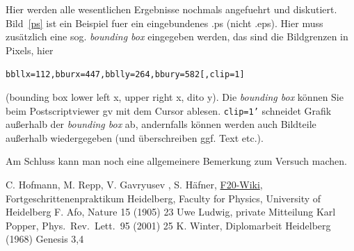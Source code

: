 \documentclass[12pt, a4paper]{article}
\begin{document}
Hier werden alle wesentlichen Ergebnisse nochmals angefuehrt und diskutiert.
Bild~\ref{ps} 
ist ein Beispiel fuer ein eingebundenes .ps (nicht .eps).
Hier muss zus\"atzlich eine sog. {\em bounding box} eingegeben werden, das 
sind die Bildgrenzen in Pixels, hier\\
\centerline{\tt bbllx=112,bburx=447,bblly=264,bbury=582[,clip=1]}
(bounding box lower left x, upper right x, dito y). Die {\it bounding box} 
k\"onnen Sie beim Postscriptviewer gv mit dem Cursor ablesen. {\tt clip=1'}
schneidet Grafik au\ss erhalb der {\it bounding box} ab, andernfalls 
k\"onnen werden auch Bildteile au\ss erhalb wiedergegeben (und \"uberschreiben
ggf. Text etc.).

Am Schluss kann man noch eine allgemeinere Bemerkung zum Versuch machen.


\newpage 


\begin{thebibliography}{00}   %
 C. Hofmann, M. Repp, V. Gavryusev , S. H\"afner, \href{https://www.physi.uni-heidelberg.de/Forschung/QD/f20wikinew/index.php/Main_Page}{F20-Wiki}, Fortgeschrittenenpraktikum Heidelberg, Faculty for Physics, University of Heidelberg
 F. Afo, Nature 15 (1905) 23
 Uwe Ludwig, private Mitteilung
 Karl Popper, Phys.~Rev.~Lett.~95 (2001) 25
 K. Winter, Diplomarbeit Heidelberg (1968)
 Genesis 3,4

\end{thebibliography}
\end{document}

